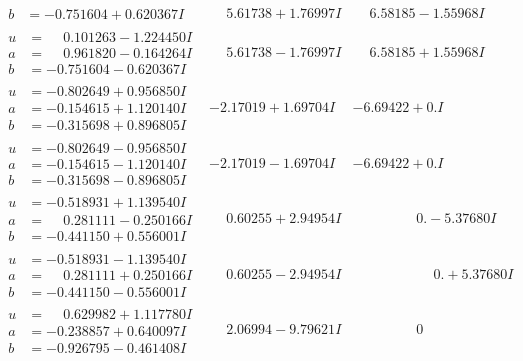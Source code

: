 \documentclass[1p]{elsarticle_modified}
\theoremstyle{definition}
\begin{document}
$$\begin{array}{c|c|c}
\begin{aligned}
b &= -0.751604 + 0.620367 I\end{aligned}
 & \phantom{-}5.61738 + 1.76997 I & \phantom{-}6.58185 - 1.55968 I \\ \hline\begin{aligned}
u &= \phantom{-}0.101263 - 1.224450 I \\
a &= \phantom{-}0.961820 - 0.164264 I \\
b &= -0.751604 - 0.620367 I\end{aligned}
 & \phantom{-}5.61738 - 1.76997 I & \phantom{-}6.58185 + 1.55968 I \\ \hline\begin{aligned}
u &= -0.802649 + 0.956850 I \\
a &= -0.154615 + 1.120140 I \\
b &= -0.315698 + 0.896805 I\end{aligned}
 & -2.17019 + 1.69704 I & -6.69422 + 0. I\phantom{ +0.000000I} \\ \hline\begin{aligned}
u &= -0.802649 - 0.956850 I \\
a &= -0.154615 - 1.120140 I \\
b &= -0.315698 - 0.896805 I\end{aligned}
 & -2.17019 - 1.69704 I & -6.69422 + 0. I\phantom{ +0.000000I} \\ \hline\begin{aligned}
u &= -0.518931 + 1.139540 I \\
a &= \phantom{-}0.281111 - 0.250166 I \\
b &= -0.441150 + 0.556001 I\end{aligned}
 & \phantom{-}0.60255 + 2.94954 I & \phantom{-0.000000 } 0. - 5.37680 I \\ \hline\begin{aligned}
u &= -0.518931 - 1.139540 I \\
a &= \phantom{-}0.281111 + 0.250166 I \\
b &= -0.441150 - 0.556001 I\end{aligned}
 & \phantom{-}0.60255 - 2.94954 I & \phantom{-0.000000 -}0. + 5.37680 I \\ \hline\begin{aligned}
u &= \phantom{-}0.629982 + 1.117780 I \\
a &= -0.238857 + 0.640097 I \\
b &= -0.926795 - 0.461408 I\end{aligned}
 & \phantom{-}2.06994 - 9.79621 I & \phantom{-0.000000 } 0 \\ \hline\begin{aligned}

\end{aligned}
\end{array}$$
\end{document}
